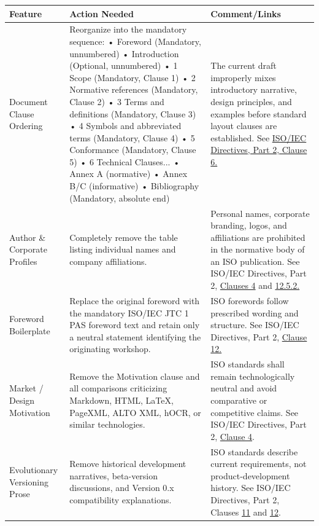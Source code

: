 \documentclass[11pt,a4paper]{article}
\begin{document}
\begin{table}[h]
\begin{tabular}{|l|l|l|}
\hline
\textbf{Feature} & \textbf{Action Needed} & \textbf{Comment/Links} \\ \hline
Document Clause Ordering & Reorganize into the mandatory sequence:  • Foreword (Mandatory, unnumbered)  • Introduction (Optional, unnumbered)  • 1 Scope (Mandatory, Clause 1)  • 2 Normative references (Mandatory, Clause 2)  • 3 Terms and definitions (Mandatory, Clause 3)  • 4 Symbols and abbreviated terms (Mandatory, Clause 4)  • 5 Conformance (Mandatory, Clause 5)  • 6 Technical Clauses...  • Annex A (normative)  • Annex B/C (informative)  • Bibliography (Mandatory, absolute end) & The current draft improperly mixes introductory narrative, design principles, and examples before standard layout clauses are established. See \href{https://www.iso.org/sites/directives/current/part2/index.xhtml\#\_idTextAnchor005}{ISO/IEC Directives, Part 2, Clause 6.} \\ \hline
Author \& Corporate Profiles & Completely remove the table listing individual names and company affiliations. & Personal names, corporate branding, logos, and affiliations are prohibited in the normative body of an ISO publication. See ISO/IEC Directives, Part 2, \href{https://www.iso.org/sites/directives/current/part2/index.xhtml\#\_idTextAnchor005}{Clauses 4} and \href{https://www.iso.org/sites/directives/current/part2/index.xhtml\#\_idTextAnchor005}{12.5.2.} \\ \hline
Foreword Boilerplate & Replace the original foreword with the mandatory ISO/IEC JTC 1 PAS foreword text and retain only a neutral statement identifying the originating workshop. & ISO forewords follow prescribed wording and structure. See ISO/IEC Directives, Part 2, \href{https://docs.google.com/document/d/1mDyHe9XrUcG0BTZP13OYKl2D\_0M9XUyG/edit}{Clause 12.} \\ \hline
Market / Design Motivation & Remove the Motivation clause and all comparisons criticizing Markdown, HTML, LaTeX, PageXML, ALTO XML, hOCR, or similar technologies. & ISO standards shall remain technologically neutral and avoid comparative or competitive claims. See ISO/IEC Directives, Part 2, \href{https://www.iso.org/sites/directives/current/part2/index.xhtml\#\_idTextAnchor005}{Clause 4}. \\ \hline
Evolutionary Versioning Prose & Remove historical development narratives, beta-version discussions, and Version 0.x compatibility explanations. & ISO standards describe current requirements, not product-development history. See ISO/IEC Directives, Part 2, Clauses \href{https://www.iso.org/sites/directives/current/part2/index.xhtml\#\_idTextAnchor005}{11} and \href{https://www.iso.org/sites/directives/current/part2/index.xhtml\#\_idTextAnchor005}{12}. \\ \hline

\end{tabular}
\end{table}
\end{document}
